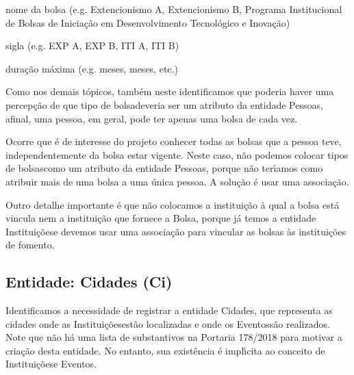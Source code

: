 \documentclass[
12pt,		%
openright,	%
twoside,  %
a4paper,			%
chapter=TITLE,		%
english,			%
french,				%
spanish,			%
brazil				%
]{USPSC-classe/USPSC}
\begin{document}
\begin{alineas}
\item nome da bolsa (e.g. \textquotedbl Extencionismo A\textquotedbl , \textquotedbl Extencionismo B\textquotedbl , \textquotedbl Programa Institucional de Bolsas de Inicia\c{c}\~ao em Desenvolvimento Tecnol\'ogico e Inova\c{c}\~ao\textquotedbl )
\item sigla (e.g. EXP A, EXP B, ITI A, ITI B)
\item dura\c{c}\~ao m\'axima (e.g.  meses\textquotedbl ,  meses\textquotedbl , etc.)
\end{alineas}

Como nos demais t\'opicos, tamb\'em neste identificamos que poderia haver uma percep\c{c}\~ao de que \textquotedbl tipo de bolsa\textquotedbl  deveria ser um atributo da entidade \textquotedbl Pessoas\textquotedbl , afinal, uma pessoa, em geral, pode ter apenas uma bolsa de cada vez.









Ocorre que \'e de interesse do projeto conhecer todas as bolsas que a pessoa teve, independentemente da bolsa estar vigente. Neste caso, n\~ao podemos colocar \textquotedbl tipos de bolsas\textquotedbl  como um atributo da entidade \textquotedbl Pessoas\textquotedbl , porque n\~ao ter\'{\i}amos como atribuir mais de uma bolsa a uma \'unica pessoa. A solu\c{c}\~ao \'e usar uma associa\c{c}\~ao.









Outro detalhe importante \'e que n\~ao colocamos a institui\c{c}\~ao \`a qual a bolsa est\'a vincula nem a institui\c{c}\~ao que fornece a Bolsa, porque j\'a temos a entidade \textquotedbl Institui\c{c}\~oes\textquotedbl  e devemos usar uma associa\c{c}\~ao para vincular as bolsas \`as institui\c{c}\~oes de fomento.









\subsection[Entidade: Cidades (Ci)]{Entidade: Cidades (Ci)}\label{Entidade: Cidades (Ci)}
Identificamos a necessidade de registrar a entidade \textquotedbl Cidades\textquotedbl , que representa as cidades onde as \textquotedbl Institui\c{c}\~oes\textquotedbl  est\~ao localizadas e onde os \textquotedbl Eventos\textquotedbl  s\~ao realizados. Note que n\~ao h\'a uma lista de substantivos na Portaria 178/2018 para motivar a cria\c{c}\~ao desta entidade. No entanto, sua exist\^encia \'e impl\'{\i}cita ao conceito de \textquotedbl Institui\c{c}\~oes\textquotedbl  e \textquotedbl Eventos\textquotedbl .
\end{document}

